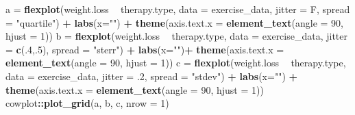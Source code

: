 \documentclass[
  man]{apa6}
\newenvironment{Shaded}{\begin{snugshade}}{\end{snugshade}}
\newcommand{\DataTypeTok}[1]{\textcolor[rgb]{0.13,0.29,0.53}{#1}}
\newcommand{\DecValTok}[1]{\textcolor[rgb]{0.00,0.00,0.81}{#1}}
\newcommand{\FloatTok}[1]{\textcolor[rgb]{0.00,0.00,0.81}{#1}}
\newcommand{\KeywordTok}[1]{\textcolor[rgb]{0.13,0.29,0.53}{\textbf{#1}}}
\newcommand{\NormalTok}[1]{#1}
\newcommand{\OperatorTok}[1]{\textcolor[rgb]{0.81,0.36,0.00}{\textbf{#1}}}
\newcommand{\StringTok}[1]{\textcolor[rgb]{0.31,0.60,0.02}{#1}}
\begin{document}
\begin{Shaded}
\begin{Highlighting}[]
\NormalTok{a =}\StringTok{ }\KeywordTok{flexplot}\NormalTok{(weight.loss }\OperatorTok{~}\StringTok{ }\NormalTok{therapy.type, }\DataTypeTok{data =}\NormalTok{ exercise_data, }
              \DataTypeTok{jitter =}\NormalTok{ F, }\DataTypeTok{spread =} \StringTok{"quartile"}\NormalTok{) }\OperatorTok{+}
\StringTok{              }\KeywordTok{labs}\NormalTok{(}\DataTypeTok{x=}\StringTok{""}\NormalTok{) }\OperatorTok{+}\StringTok{ }
\StringTok{              }\KeywordTok{theme}\NormalTok{(}\DataTypeTok{axis.text.x =} \KeywordTok{element_text}\NormalTok{(}\DataTypeTok{angle =} \DecValTok{90}\NormalTok{, }\DataTypeTok{hjust =} \DecValTok{1}\NormalTok{))}
\NormalTok{b =}\StringTok{ }\KeywordTok{flexplot}\NormalTok{(weight.loss }\OperatorTok{~}\StringTok{ }\NormalTok{therapy.type, }\DataTypeTok{data =}\NormalTok{ exercise_data, }
              \DataTypeTok{jitter =} \KeywordTok{c}\NormalTok{(.}\DecValTok{4}\NormalTok{,.}\DecValTok{5}\NormalTok{), }\DataTypeTok{spread =} \StringTok{"sterr"}\NormalTok{) }\OperatorTok{+}
\StringTok{              }\KeywordTok{labs}\NormalTok{(}\DataTypeTok{x=}\StringTok{""}\NormalTok{)}\OperatorTok{+}
\StringTok{              }\KeywordTok{theme}\NormalTok{(}\DataTypeTok{axis.text.x =} \KeywordTok{element_text}\NormalTok{(}\DataTypeTok{angle =} \DecValTok{90}\NormalTok{, }\DataTypeTok{hjust =} \DecValTok{1}\NormalTok{))  }
\NormalTok{c =}\StringTok{ }\KeywordTok{flexplot}\NormalTok{(weight.loss }\OperatorTok{~}\StringTok{ }\NormalTok{therapy.type, }\DataTypeTok{data =}\NormalTok{ exercise_data, }
              \DataTypeTok{jitter =} \FloatTok{.2}\NormalTok{, }\DataTypeTok{spread =} \StringTok{"stdev"}\NormalTok{) }\OperatorTok{+}\StringTok{ }
\StringTok{              }\KeywordTok{labs}\NormalTok{(}\DataTypeTok{x=}\StringTok{""}\NormalTok{) }\OperatorTok{+}\StringTok{ }
\StringTok{              }\KeywordTok{theme}\NormalTok{(}\DataTypeTok{axis.text.x =} \KeywordTok{element_text}\NormalTok{(}\DataTypeTok{angle =} \DecValTok{90}\NormalTok{, }\DataTypeTok{hjust =} \DecValTok{1}\NormalTok{))    }
\NormalTok{cowplot}\OperatorTok{::}\KeywordTok{plot_grid}\NormalTok{(a, b, c, }\DataTypeTok{nrow =} \DecValTok{1}\NormalTok{)}
\end{Highlighting}
\end{Shaded}
\end{document}
